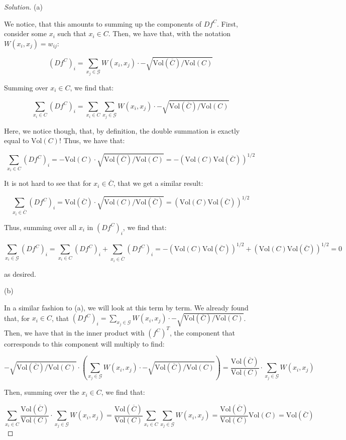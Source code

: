 \documentclass[10pt]{article}
\newcommand{\vol}{{\text{Vol}}}
\begin{document}
\begin{proof}[Solution]

(a)

We notice, that this amounts to summing up the components of $Df^C$. First, consider some $x_i$ such that $x_i \in C$. Then, we have that, with the notation $W(x_i, x_j) = w_{ij}$:

$$(Df^C)_i = \sum_{x_j \in \mathcal{G}}  W(x_i, x_j) \cdot -\sqrt{\vol(\overline{C})/\vol(C)} $$

Summing over $x_i \in C$, we find that:

$$ \sum_{x_i \in C} (Df^C)_i =  \sum_{x_i \in C}  \sum_{x_j \in \mathcal{G}}  W(x_i, x_j) \cdot -\sqrt{\vol(\overline{C})/\vol(C)}$$

Here, we notice though, that, by definition, the double summation is exactly equal to $\vol(C)$! Thus, we have that:

$$ \sum_{x_i \in C} (Df^C)_i = - \vol(C) \cdot \sqrt{\vol(\overline{C})/\vol(C)} = - (\vol(C) \vol(\overline{C}))^{1/2} $$

It is not hard to see that for $x_i \in \overline{C}$, that we get a similar result:

$$ \sum_{x_i \in \overline{C}} (Df^C)_i = \vol(\overline{C}) \cdot \sqrt{\vol(C)/\vol(\overline{C})} =  (\vol(C) \vol(\overline{C}))^{1/2}$$

Thus, summing over all $x_i$ in $(Df^C)_i$, we find that:

$$\sum_{x_i \in \mathcal{G}} (Df^C)_i =  \sum_{x_i \in C} (Df^C)_i +  \sum_{x_i \in \overline{C}} (Df^C)_i =  - (\vol(C) \vol(\overline{C}))^{1/2} +  (\vol(C) \vol(\overline{C}))^{1/2} = 0$$

as desired.

(b)

In a similar fashion to (a), we will look at this term by term. We already found that, for $x_i \in C$, that $(Df^C)_i = \sum_{x_j \in \mathcal{G}}  W(x_i, x_j) \cdot -\sqrt{\vol(\overline{C})/\vol(C)} $. Then, we have that in the inner product with $(f^C)^T$, the component that corresponds to this component will multiply to find:

$$  -\sqrt{\vol(\overline{C})/\vol(C)} \cdot \left( \sum_{x_j \in \mathcal{G}}  W(x_i, x_j) \cdot -\sqrt{\vol(\overline{C})/\vol(C)} \right) = \frac{\vol(\overline{C})}{\vol(C)} \cdot \sum_{x_j \in \mathcal{G}}  W(x_i, x_j) $$

Then, summing over the $x_i \in C$, we find that:

$$ \sum_{x_i \in C} \frac{\vol(\overline{C})}{\vol(C)} \cdot \sum_{x_j \in \mathcal{G}}  W(x_i, x_j) =  \frac{\vol(\overline{C})}{\vol(C)} \sum_{x_i \in C} \sum_{x_j \in \mathcal{G}} W(x_i, x_j) = \frac{\vol(\overline{C})}{\vol(C)} \vol(C) = \vol(\overline{C})$$


\end{proof}
\end{document}
